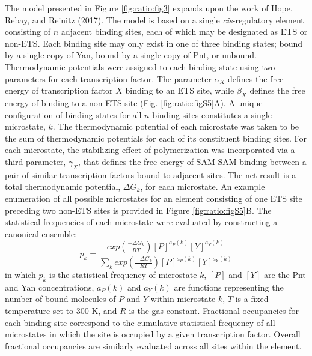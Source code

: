 The model presented in Figure \ref{fig:ratio:fig3} expands upon the work of Hope, Rebay, and Reinitz (2017). The model is based on a single \textit{cis}-regulatory element consisting of $n$ adjacent binding sites, each of which may be designated as ETS or non-ETS. Each binding site may only exist in one of three binding states; bound by a single copy of Yan, bound by a single copy of Pnt, or unbound. Thermodynamic potentials were assigned to each binding state using two parameters for each transcription factor. The parameter $\alpha_X$ defines the free energy of transcription factor $X$ binding to an ETS site, while $\beta_X$ defines the free energy of binding to a non-ETS site (Fig. \ref{fig:ratio:figS5}A). A unique configuration of binding states for all $n$ binding sites constitutes a single microstate, $k$. The thermodynamic potential of each microstate was taken to be the sum of thermodynamic potentials for each of its constituent binding sites. For each microstate, the stabilizing effect of polymerization was incorporated via a third parameter, $\gamma_X$, that defines the free energy of SAM-SAM binding between a pair of similar transcription factors bound to adjacent sites. The net result is a total thermodynamic potential, $\Delta G_k$, for each microstate. An example enumeration of all possible microstates for an element consisting of one ETS site preceding two non-ETS sites is provided in Figure \ref{fig:ratio:figS5}B. The statistical frequencies of each microstate were evaluated by constructing a canonical ensemble:
\begin{equation}
p_k = \frac{\displaystyle exp( \frac{-\Delta G_k}{RT} ) [P]^{a_P(k)}[Y]^{a_Y(k)} } {\displaystyle \sum_{k} {exp(\frac{-\Delta G_k}{RT})[P]^{a_P(k)}[Y]^{a_Y(k)}}}
\end{equation}
in which $p_k$ is the statistical frequency of microstate $k$, $[P]$ and $[Y]$ are the Pnt and Yan concentrations, $a_P(k)$ and $a_Y(k)$ are functions representing the number of bound molecules of $P$ and $Y$ within microstate $k$, $T$ is a fixed temperature set to 300 K, and $R$ is the gas constant. Fractional occupancies for each binding site correspond to the cumulative statistical frequency of all microstates in which the site is occupied by a given transcription factor. Overall fractional occupancies are similarly evaluated across all sites within the element.

